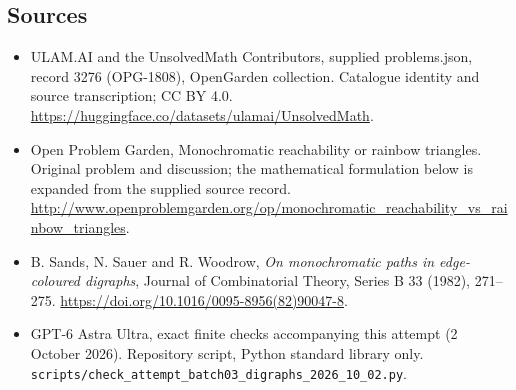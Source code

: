\documentclass[11pt,a4paper]{article}
\begin{document}
\subsection{Sources}
\begin{itemize}
\item[S1] ULAM.AI and the UnsolvedMath Contributors, supplied problems.json, record 3276 (OPG-1808), OpenGarden collection. Catalogue identity and source transcription; CC BY 4.0.
\url{https://huggingface.co/datasets/ulamai/UnsolvedMath}.
\item[S2] Open Problem Garden, Monochromatic reachability or rainbow triangles. Original problem and discussion; the mathematical formulation below is expanded from the supplied source record.
\url{http://www.openproblemgarden.org/op/monochromatic_reachability_vs_rainbow_triangles}.
\item[S3] B. Sands, N. Sauer and R. Woodrow, \emph{On monochromatic paths in edge-coloured digraphs}, Journal of Combinatorial Theory, Series B 33 (1982), 271--275. \url{https://doi.org/10.1016/0095-8956(82)90047-8}.
\item[S9] GPT-6 Astra Ultra, exact finite checks accompanying this attempt (2 October 2026). Repository script, Python standard library only. \texttt{scripts/check\_attempt\_batch03\_digraphs\_2026\_10\_02.py}.
\end{itemize}
\end{document}
